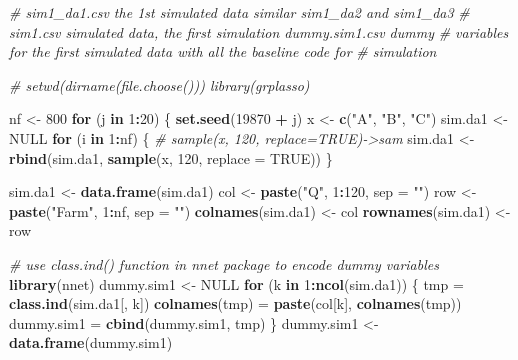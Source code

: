 \documentclass[12pt,]{krantz}
\makeatletter
\newenvironment{Shaded}{\begin{snugshade}}{\end{snugshade}}
\newcommand{\KeywordTok}[1]{\textcolor[rgb]{0.27,0.27,0.27}{\textbf{#1}}}
\newcommand{\DataTypeTok}[1]{\textcolor[rgb]{0.27,0.27,0.27}{#1}}
\newcommand{\DecValTok}[1]{\textcolor[rgb]{0.06,0.06,0.06}{#1}}
\newcommand{\StringTok}[1]{\textcolor[rgb]{0.5,0.5,0.5}{#1}}
\newcommand{\CommentTok}[1]{\textcolor[rgb]{0.37,0.37,0.37}{\textit{#1}}}
\newcommand{\OtherTok}[1]{\textcolor[rgb]{0.37,0.37,0.37}{#1}}
\newcommand{\ControlFlowTok}[1]{\textcolor[rgb]{0.27,0.27,0.27}{\textbf{#1}}}
\newcommand{\OperatorTok}[1]{\textcolor[rgb]{0.43,0.43,0.43}{\textbf{#1}}}
\newcommand{\NormalTok}[1]{#1}
\newenvironment{kframe}{%
\medskip{}
\setlength{\fboxsep}{.8em}
 \def\at@end@of@kframe{}%
 \ifinner\ifhmode%
  \def\at@end@of@kframe{\end{minipage}}%
  \begin{minipage}{\columnwidth}%
 \fi\fi%
 \def\FrameCommand##1{\hskip\@totalleftmargin \hskip-\fboxsep
 \colorbox{shadecolor}{##1}\hskip-\fboxsep
     \hskip-\linewidth \hskip-\@totalleftmargin \hskip\columnwidth}%
 \MakeFramed {\advance\hsize-\width
   \@totalleftmargin\z@ \linewidth\hsize
   \@setminipage}}%
 {\par\unskip\endMakeFramed%
 \at@end@of@kframe}
\renewenvironment{Shaded}{\begin{kframe}}{\end{kframe}}
\theoremstyle{definition}
\theoremstyle{definition}
\theoremstyle{definition}
\theoremstyle{remark}
\makeatother
\begin{document}
\begin{Shaded}
\begin{Highlighting}[]
\CommentTok{# sim1_da1.csv the 1st simulated data similar sim1_da2 and sim1_da3}
\CommentTok{# sim1.csv simulated data, the first simulation dummy.sim1.csv dummy}
\CommentTok{# variables for the first simulated data with all the baseline code for}
\CommentTok{# simulation}

\CommentTok{# setwd(dirname(file.choose())) library(grplasso)}

\NormalTok{nf <-}\StringTok{ }\DecValTok{800}
\ControlFlowTok{for}\NormalTok{ (j }\ControlFlowTok{in} \DecValTok{1}\OperatorTok{:}\DecValTok{20}\NormalTok{) \{}
    \KeywordTok{set.seed}\NormalTok{(}\DecValTok{19870} \OperatorTok{+}\StringTok{ }\NormalTok{j)}
\NormalTok{    x <-}\StringTok{ }\KeywordTok{c}\NormalTok{(}\StringTok{"A"}\NormalTok{, }\StringTok{"B"}\NormalTok{, }\StringTok{"C"}\NormalTok{)}
\NormalTok{    sim.da1 <-}\StringTok{ }\OtherTok{NULL}
    \ControlFlowTok{for}\NormalTok{ (i }\ControlFlowTok{in} \DecValTok{1}\OperatorTok{:}\NormalTok{nf) \{}
        \CommentTok{# sample(x, 120, replace=TRUE)->sam}
\NormalTok{        sim.da1 <-}\StringTok{ }\KeywordTok{rbind}\NormalTok{(sim.da1, }\KeywordTok{sample}\NormalTok{(x, }\DecValTok{120}\NormalTok{, }\DataTypeTok{replace =} \OtherTok{TRUE}\NormalTok{))}
\NormalTok{    \}}
    
\NormalTok{    sim.da1 <-}\StringTok{ }\KeywordTok{data.frame}\NormalTok{(sim.da1)}
\NormalTok{    col <-}\StringTok{ }\KeywordTok{paste}\NormalTok{(}\StringTok{"Q"}\NormalTok{, }\DecValTok{1}\OperatorTok{:}\DecValTok{120}\NormalTok{, }\DataTypeTok{sep =} \StringTok{""}\NormalTok{)}
\NormalTok{    row <-}\StringTok{ }\KeywordTok{paste}\NormalTok{(}\StringTok{"Farm"}\NormalTok{, }\DecValTok{1}\OperatorTok{:}\NormalTok{nf, }\DataTypeTok{sep =} \StringTok{""}\NormalTok{)}
    \KeywordTok{colnames}\NormalTok{(sim.da1) <-}\StringTok{ }\NormalTok{col}
    \KeywordTok{rownames}\NormalTok{(sim.da1) <-}\StringTok{ }\NormalTok{row}
    
    \CommentTok{# use class.ind() function in nnet package to encode dummy variables}
    \KeywordTok{library}\NormalTok{(nnet)}
\NormalTok{    dummy.sim1 <-}\StringTok{ }\OtherTok{NULL}
    \ControlFlowTok{for}\NormalTok{ (k }\ControlFlowTok{in} \DecValTok{1}\OperatorTok{:}\KeywordTok{ncol}\NormalTok{(sim.da1)) \{}
\NormalTok{        tmp =}\StringTok{ }\KeywordTok{class.ind}\NormalTok{(sim.da1[, k])}
        \KeywordTok{colnames}\NormalTok{(tmp) =}\StringTok{ }\KeywordTok{paste}\NormalTok{(col[k], }\KeywordTok{colnames}\NormalTok{(tmp))}
\NormalTok{        dummy.sim1 =}\StringTok{ }\KeywordTok{cbind}\NormalTok{(dummy.sim1, tmp)}
\NormalTok{    \}}
\NormalTok{    dummy.sim1 <-}\StringTok{ }\KeywordTok{data.frame}\NormalTok{(dummy.sim1)}
    

\end{Highlighting}
\end{Shaded}
\end{document}

